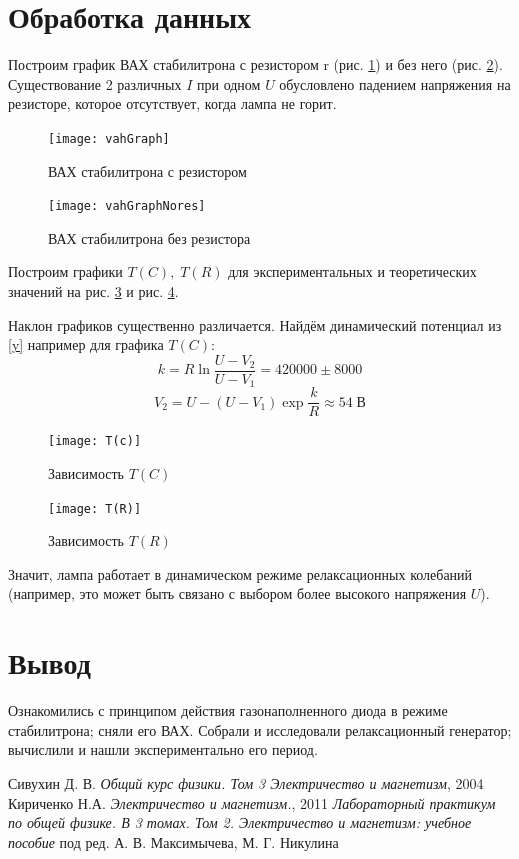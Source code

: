 \documentclass[a4paper]{article}
\newcommand{\picref}[1]{рис. \ref{#1}}
\begin{document}
\section{Обработка данных}

Построим график ВАХ стабилитрона с резистором r (\picref{fig:vahgraph}) и без него (\picref{fig:vahgraphnores}). Существование 2 различных $ I $ при одном $ U $ обусловлено падением напряжения на резисторе, которое отсутствует, когда лампа не горит.

\begin{figure}[tbp]
	\centering
	\texttt{[image: vahGraph]}
	\caption{ВАХ стабилитрона с резистором}
	\label{fig:vahgraph}
\end{figure}

\begin{figure}[tbp]
	\centering
	\texttt{[image: vahGraphNores]}
	\caption{ВАХ стабилитрона без резистора}
	\label{fig:vahgraphnores}
\end{figure}

Построим графики $ T(C), \; T(R) $ для экспериментальных и теоретических значений на \picref{a} и \picref{b}.

Наклон графиков существенно различается. Найдём динамический потенциал из \eqref{y} например для графика $ T(C) $:
\begin{equation*}\label{key}
	k = R \ln \frac{U-V_2}{U-V_1} = 420000 \pm 8000
\end{equation*}
\begin{equation*}\label{key}
	V_2 = U-(U-V_1)\exp \frac{k}{R} \approx 54 \; В
\end{equation*}

\begin{figure}[tbp]
	\centering
	\texttt{[image: T(c)]}
	\caption{Зависимость $T(C)$}
	\label{a}
\end{figure}
\begin{figure}[tbp]
	\centering
	\texttt{[image: T(R)]}
	\caption{Зависимость $T(R)$}
	\label{b}
\end{figure}

Значит, лампа работает в динамическом режиме релаксационных колебаний (например, это может быть связано с выбором более высокого напряжения $ U $).


\section{Вывод}

Ознакомились с принципом действия газонаполненного диода в режиме стабилитрона; сняли его ВАХ. Собрали и исследовали релаксационный генератор; вычислили и нашли экспериментально его период.

\newpage
\begin{thebibliography}{9}
	 Сивухин Д. В. \emph{Общий курс физики. Том 3 Электричество и магнетизм}, 2004
	 Кириченко Н.А. \emph{Электричество и магнетизм.}, 2011
	 \emph{Лабораторный практикум по общей физике. В 3 томах. Том 2. Электричество и магнетизм: учебное пособие} под ред. А. В. Максимычева, М. Г. Никулина
\end{thebibliography}
\end{document}
